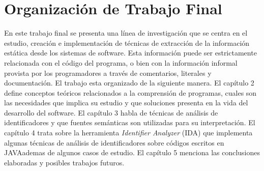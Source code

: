\documentclass[12pt]{report}
\begin{document}
\section{Organización de Trabajo Final}
En este trabajo final se presenta una línea de investigación que se centra en el estudio, 
creación e implementación de técnicas de extracción de la información estática desde 
los sistemas de software. 
Esta información puede ser estrictamente relacionada con el código del programa, 
o bien con la información informal provista por los programadores a través de 
comentarios, literales y documentación. El trabajo esta organizado de la siguiente manera. El capítulo 2 define conceptos teóricos relacionados a la comprensión de programas, cuales son las necesidades que implica su estudio y que soluciones presenta en la vida del desarrollo del software. El capítulo 3 habla de técnicas de análisis de identificadores y que fuentes semánticas son utilizadas para su interpretación. El capítulo 4 trata sobre la herramienta \textit{Identifier Analyzer} (IDA) que implementa algunas técnicas de análisis de identificadores sobre códigos escritos en JAVA\texttrademark ademas de algunos casos de estudio. El capítulo 5 menciona las conclusiones elaboradas y posibles trabajos futuros.


\end{document}
